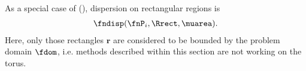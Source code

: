 %
As a special case of (), dispersion on rectangular regions is
\begin{align*}
  \fndisp(\fnP_i, \Rrect, \muarea).
\end{align*}
Here, only those rectangles $\bm r$ are considered to be bounded by the problem domain $\fdom$, i.e. methods described within this section are not working on the torus.
